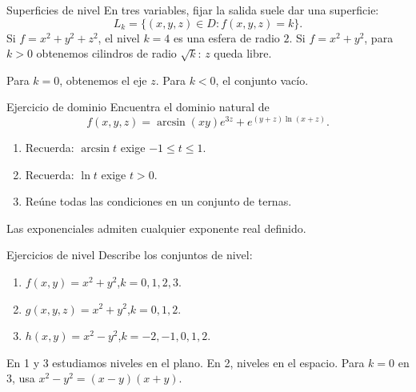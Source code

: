\begin{frame}{Superficies de nivel}
En tres variables, fijar la salida suele dar una superficie:
\[L_k=\{(x,y,z)\in D:f(x,y,z)=k\}.\]
Si $f=x^2+y^2+z^2$, el nivel $k=4$ es una esfera de radio $2$.
\medskip
Si $f=x^2+y^2$, para $k>0$ obtenemos cilindros de radio $\sqrt k$: $z$ queda libre.

Para $k=0$, obtenemos el eje $z$. Para $k<0$, el conjunto vacío.
\end{frame}
\begin{frame}{Ejercicio de dominio}
Encuentra el dominio natural de
\[f(x,y,z)=\arcsin(xy)e^{3z}+e^{(y+z)\ln(x+z)}.\]
\begin{enumerate}
\item Recuerda: $\arcsin t$ exige $-1\le t\le1$.
\item Recuerda: $\ln t$ exige $t>0$.
\item Reúne todas las condiciones en un conjunto de ternas.
\end{enumerate}
Las exponenciales admiten cualquier exponente real definido.
\end{frame}
\begin{frame}{Ejercicios de nivel}
Describe los conjuntos de nivel:
\begin{enumerate}
\item $f(x,y)=x^2+y^2$,\quad $k=0,1,2,3$.
\item $g(x,y,z)=x^2+y^2$,\quad $k=0,1,2$.
\item $h(x,y)=x^2-y^2$,\quad $k=-2,-1,0,1,2$.
\end{enumerate}
En 1 y 3 estudiamos niveles en el plano. En 2, niveles en el espacio.
\medskip
Para $k=0$ en 3, usa $x^2-y^2=(x-y)(x+y)$.
\end{frame}

